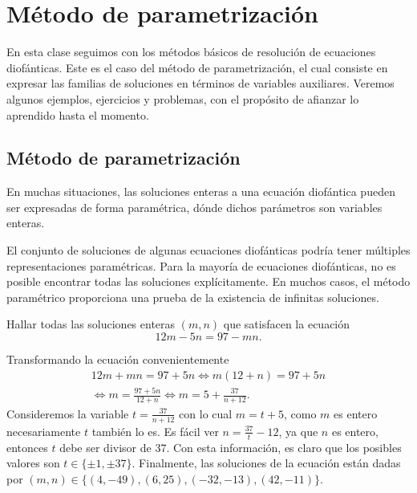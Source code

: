 \section{Método de parametrización}

    En esta clase seguimos con los métodos básicos de resolución de ecuaciones diofánticas.
    Este es el caso del método de parametrización, el cual consiste en expresar las familias de soluciones en términos de
    variables auxiliares.
    Veremos algunos ejemplos, ejercicios y problemas, con el propósito de afianzar lo aprendido hasta el momento.


\subsection{Método de parametrización}

En muchas situaciones, las soluciones enteras a una ecuación diofántica pueden ser expresadas de forma paramétrica, dónde dichos parámetros son variables enteras.

El conjunto de soluciones de algunas ecuaciones diofánticas podría tener múltiples representaciones paramétricas.
Para la mayoría de ecuaciones diofánticas, no es posible encontrar todas las soluciones explícitamente.
En muchos casos, el método paramétrico proporciona una prueba de la existencia de infinitas soluciones.

\begin{example}
    Hallar todas las soluciones enteras $(m,n)$ que satisfacen la ecuación
    \[
        12m - 5n = 97 - mn.
    \]
\end{example}
\begin{solution}
    Transformando la ecuación convenientemente
    \begin{multline*}
        12m + mn = 97 + 5n \iff
        m(12 + n) = 97 + 5n\\ \iff
        m = \frac{97 + 5n}{12 + n} \iff
        m = 5 + \frac{37}{n + 12}.
    \end{multline*}
    Consideremos la variable $t = \frac{37}{n + 12}$ con lo cual $m = t + 5$, como $m$ es entero necesariamente $t$
    también lo es.
    Es fácil ver $n = \frac{37}{t} - 12$, ya que $n$ es entero, entonces $t$ debe ser divisor de 37.
    Con esta información, es claro que los posibles valores son $t \in \{\pm 1, \pm 37 \}$.
    Finalmente, las soluciones de la ecuación están dadas por $(m,n) \in \{(4, -49), (6, 25), (-32, -13), (42, -11)\}$.
\end{solution}

